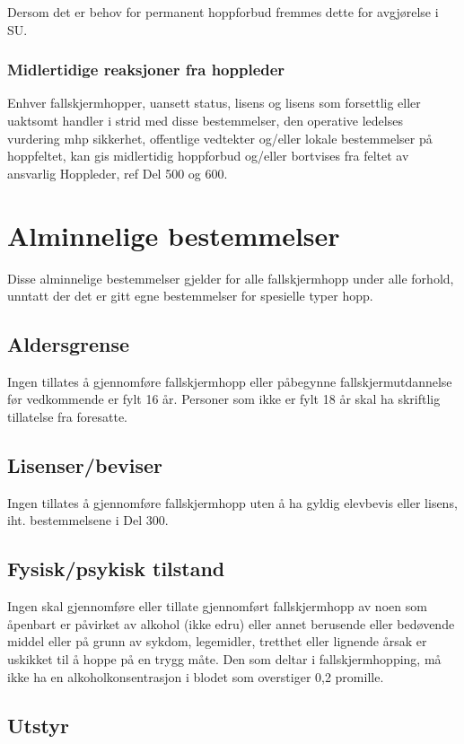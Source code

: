 Dersom det er behov for permanent hoppforbud fremmes dette for avgjørelse i SU.

\subsubsection{Midlertidige reaksjoner fra hoppleder}
Enhver fallskjermhopper, uansett status, lisens og lisens som forsettlig eller uaktsomt handler i strid med disse bestemmelser, den operative ledelses vurdering mhp sikkerhet, offentlige vedtekter og/eller lokale bestemmelser på hoppfeltet, kan gis midlertidig hoppforbud og/eller bortvises fra feltet av ansvarlig Hoppleder, ref Del 500 og 600.

\section{Alminnelige bestemmelser}
Disse alminnelige bestemmelser gjelder for alle fallskjermhopp under alle forhold, unntatt der det er gitt egne bestemmelser for spesielle typer hopp.

\subsection{Aldersgrense}
Ingen tillates å gjennomføre fallskjermhopp eller påbegynne fallskjermutdannelse før vedkommende er fylt 16 år. Personer som ikke er fylt 18 år skal ha skriftlig tillatelse fra foresatte.

\subsection{Lisenser/beviser}
Ingen tillates å gjennomføre fallskjermhopp uten å ha gyldig elevbevis eller lisens, iht. bestemmelsene i Del 300.

\subsection{Fysisk/psykisk tilstand}
Ingen skal gjennomføre eller tillate gjennomført fallskjermhopp av noen som åpenbart er påvirket av alkohol (ikke edru) eller annet berusende eller bedøvende middel eller på grunn av sykdom, legemidler, tretthet eller lignende årsak er uskikket til å hoppe på en trygg måte. Den som deltar i fallskjermhopping, må ikke ha en alkoholkonsentrasjon i blodet som overstiger 0,2 promille.

\subsection{Utstyr}
